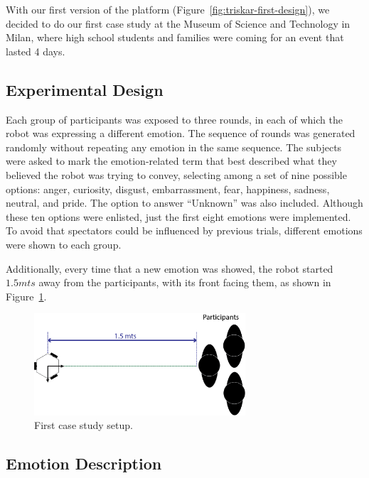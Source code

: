 With our first version of the platform (Figure~\ref{fig:triskar-first-design}), we decided to do our first case study at the Museum of Science and Technology in Milan, where high school students and families were coming for an event that lasted 4 days. 


\subsection{Experimental Design}

Each group of participants was exposed to three rounds, in each of which the robot was expressing a different emotion. The sequence of rounds was generated randomly without repeating any emotion in the same sequence. The subjects were asked to mark the emotion-related term that best described what they believed the robot was trying to convey, selecting among a set of nine possible options: anger, curiosity, disgust, embarrassment, fear, happiness, sadness, neutral, and pride. The option to answer ``Unknown'' was also included. Although these ten options were enlisted, just the first eight emotions were implemented. To avoid that spectators could be influenced by previous trials, different emotions were shown to each group.

Additionally, every time that a new emotion was showed, the robot started $1.5 mts$ away from the participants, with its front facing them, as shown in  Figure~\ref{fig:setup}. 

\begin{figure}[h]
	\centering
	\includegraphics[width=0.7\textwidth]{./Images/FirstCase.png} 
	\caption{First case study setup.}
	\label{fig:setup}
\end{figure}  


\subsection{Emotion Description}

